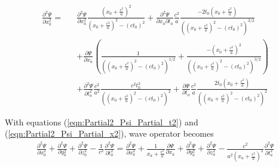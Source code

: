 \documentclass[prd,showpacs,preprint]{revtex4-1}
\begin{document}
\begin{eqnarray}
\frac{\partial^2 \Psi}{\partial x_0^2} =&& \frac{\partial^2 \Psi}{\partial x_a^2}\frac{(x_0+\frac{c^2}{a})^2}{(x_0+\frac{c^2}{a})^2-(ct_0)^2} + \frac{\partial^2 \Psi}{\partial x_a\partial t_a}\frac{c^2}{a}\frac{-2t_0(x_0+\frac{c^2}{a})}{((x_0+\frac{c^2}{a})^2-(ct_0)^2)^{3/2}}\nonumber\\
&& + \frac{\partial \Psi}{\partial x_a}(\frac{1}{((x_0+\frac{c^2}{a})^2-(ct_0)^2)^{1/2}} + \frac{-(x_0+\frac{c^2}{a})^2}{((x_0+\frac{c^2}{a})^2-(ct_0)^2)^{3/2}})\nonumber\\
&& + \frac{\partial^2 \Psi}{\partial t_a^2}\frac{c^2}{a^2}\frac{c^2t_0^2}{((x_0+\frac{c^2}{a})^2-(ct_0)^2)^2} + \frac{\partial \Psi}{\partial t_a}\frac{c^2}{a}\frac{2t_0(x_0+\frac{c^2}{a})}{((x_0+\frac{c^2}{a})^2-(ct_0)^2)^2}
\label{eqn:Partial2_Psi_Partial_x2}
\end{eqnarray}

With equations (\ref{eqn:Partial2_Psi_Partial_t2}) and (\ref{eqn:Partial2_Psi_Partial_x2}), wave operator becomes
\begin{eqnarray}
\frac{\partial^2 \Psi}{\partial x_0^2}+\frac{\partial^2 \Psi}{\partial y_0^2} + \frac{\partial^2 \Psi}{\partial z_0^2} - \frac{1}{c^2}\frac{\partial^2 \Psi}{\partial t_0^2} = \frac{\partial^2 \Psi}{\partial x_a^2} + \frac{1}{x_a+\frac{c^2}{a}}\frac{\partial \Psi}{\partial x_a} + \frac{\partial^2 \Psi}{\partial y_a^2} + \frac{\partial^2 \Psi}{\partial z_a^2} - \frac{c^2}{a^2(x_a+\frac{c^2}{a})^2}\frac{\partial^2 \Psi}{\partial t_a^2}
\label{eqn:Sint}
\end{eqnarray}
\end{document}
